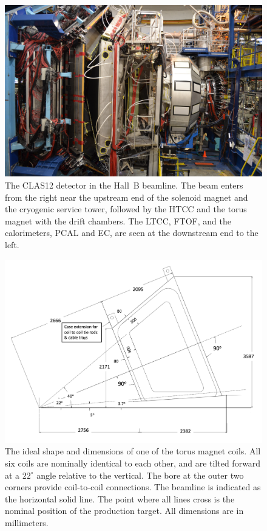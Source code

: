 \documentclass[final,3p,twocolumn]{elsarticle}
\begin{document}
\begin{figure}[bhtp!]
\centerline{\includegraphics[width=1.4\columnwidth]{CLAS12_photo-1.jpg}}
\caption{The CLAS12 detector in the Hall~B beamline. The beam enters from the right near the upstream end of
  the solenoid magnet and the cryogenic service tower, followed by the HTCC and the torus magnet with the drift
  chambers. The LTCC, FTOF, and the calorimeters, PCAL and EC, are seen at the downstream end to the left.}
\label{clas12-photo}
\end{figure}


\begin{figure}[th!]
\centerline{\includegraphics[width=0.90\columnwidth]{clas12_desired.png}}
\caption{The ideal shape and dimensions of one of the torus magnet coils. All six coils are nominally identical to each
other, and are tilted forward at a $22^\circ$ angle relative to the vertical. The bore at the outer two corners
provide coil-to-coil connections. The beamline is indicated as the horizontal solid line. The point where all lines cross
is the nominal position of the production target. All dimensions are in millimeters. }
\label{coil-shape}
\end{figure}
\end{document}
